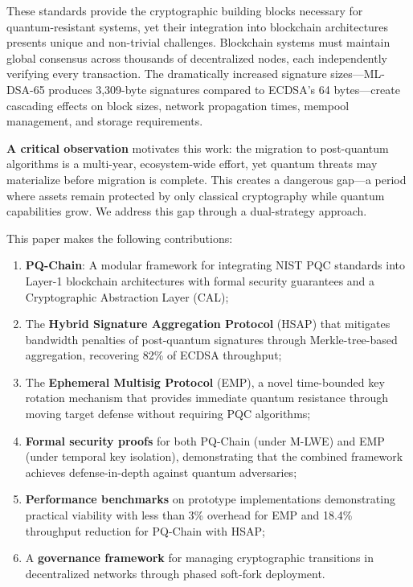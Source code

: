 \documentclass[12pt, a4paper, twocolumn]{article}
\begin{document}
These standards provide the cryptographic building blocks necessary for quantum-resistant systems, yet their integration into blockchain architectures presents unique and non-trivial challenges. Blockchain systems must maintain global consensus across thousands of decentralized nodes, each independently verifying every transaction. The dramatically increased signature sizes---ML-DSA-65 produces 3,309-byte signatures compared to ECDSA's 64 bytes---create cascading effects on block sizes, network propagation times, mempool management, and storage requirements.

\textbf{A critical observation} motivates this work: the migration to post-quantum algorithms is a multi-year, ecosystem-wide effort, yet quantum threats may materialize before migration is complete. This creates a dangerous gap---a period where assets remain protected by only classical cryptography while quantum capabilities grow. We address this gap through a dual-strategy approach.

This paper makes the following contributions:

\begin{enumerate}[noitemsep]
  \item \textbf{PQ-Chain}: A modular framework for integrating NIST PQC standards into Layer-1 blockchain architectures with formal security guarantees and a Cryptographic Abstraction Layer (CAL);
  \item The \textbf{Hybrid Signature Aggregation Protocol} (HSAP) that mitigates bandwidth penalties of post-quantum signatures through Merkle-tree-based aggregation, recovering 82\% of ECDSA throughput;
  \item The \textbf{Ephemeral Multisig Protocol} (EMP), a novel time-bounded key rotation mechanism that provides immediate quantum resistance through moving target defense without requiring PQC algorithms;
  \item \textbf{Formal security proofs} for both PQ-Chain (under M-LWE) and EMP (under temporal key isolation), demonstrating that the combined framework achieves defense-in-depth against quantum adversaries;
  \item \textbf{Performance benchmarks} on prototype implementations demonstrating practical viability with less than 3\% overhead for EMP and 18.4\% throughput reduction for PQ-Chain with HSAP;
  \item A \textbf{governance framework} for managing cryptographic transitions in decentralized networks through phased soft-fork deployment.
\end{enumerate}
\end{document}
